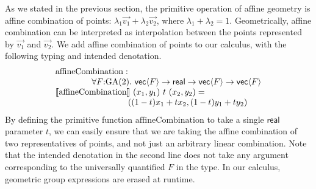 As we stated in the previous section, the primitive operation of
affine geometry is affine combination of points: $\lambda_1\vec{v_1} +
\lambda_2\vec{v_2}$, where $\lambda_1 + \lambda_2 = 1$. Geometrically,
affine combination can be interpreted as interpolation between the
points represented by $\vec{v_1}$ and $\vec{v_2}$. We add affine
combination of points to our calculus, with the following typing and
intended denotation.
\begin{displaymath}
  \begin{array}{l}
    \mathrm{affineCombination} :\\
    \hspace{1.5cm}\forall F \mathord: \GA(2).\ \mathsf{vec}\langle F \rangle \to \mathsf{real} \to \mathsf{vec}\langle F \rangle \to \mathsf{vec}\langle F \rangle \\
    \sem{\mathrm{affineCombination}}\ (x_1,y_1)\ t\ (x_2,y_2) = \\
    \hspace{3cm}((1-t)x_1 + tx_2, (1-t)y_1 + ty_2)
  \end{array}
\end{displaymath}
By defining the primitive function $\mathrm{affineCombination}$ to
take a single $\mathsf{real}$ parameter $t$, we can easily ensure that
we are taking the affine combination of two representatives of points,
and not just an arbitrary linear combination. Note that the intended
denotation in the second line does not take any argument corresponding
to the universally quantified $F$ in the type. In our calculus,
geometric group expressions are erased at runtime.


